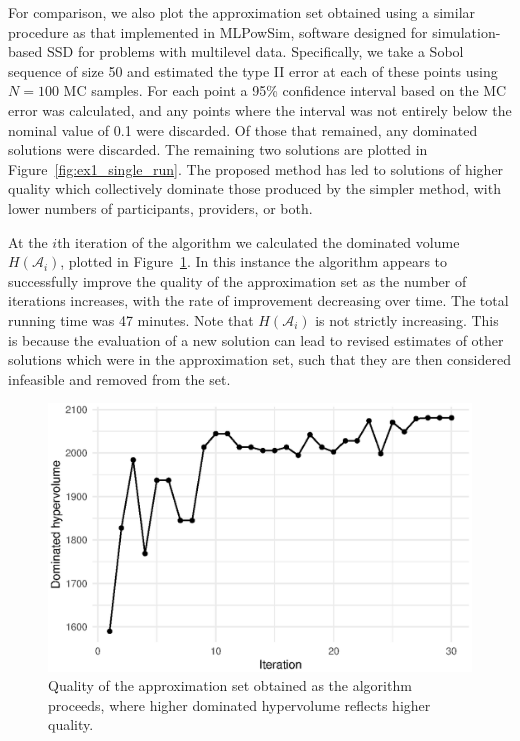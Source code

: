 \documentclass[sagev, doublespace, Crown]{sagej}
\begin{document}
For comparison, we also plot the approximation set obtained using a similar procedure as that implemented in MLPowSim, software designed for simulation-based SSD for problems with multilevel data. Specifically, we take a Sobol sequence of size 50 and estimated the type II error at each of these points using $N = 100$ MC samples. For each point a 95\% confidence interval based on the MC error was calculated, and any points where the interval was not entirely below the nominal value of 0.1 were discarded. Of those that remained, any dominated solutions were discarded. The remaining two solutions are plotted in Figure~\ref{fig:ex1_single_run}. The proposed method has led to solutions of higher quality which collectively dominate those produced by the simpler method, with lower numbers of participants, providers, or both.

At the $i$th iteration of the algorithm we calculated the dominated volume $H(\mathcal{A}_{i})$, plotted in Figure~\ref{fig:ex1_traj}. In this instance the algorithm appears to successfully improve the quality of the approximation set as the number of iterations increases, with the rate of improvement decreasing over time. The total running time was 47 minutes. Note that $H(\mathcal{A}_{i})$ is not strictly increasing. This is because the evaluation of a new solution can lead to revised estimates of other solutions which were in the approximation set, such that they are then considered infeasible and removed from the set. 

\begin{figure}
\centering
\includegraphics[scale=0.8]{fig5_ex1_traj.eps}
\caption{Quality of the approximation set obtained as the algorithm proceeds, where higher dominated hypervolume reflects higher quality.}
\label{fig:ex1_traj}
\end{figure}
\end{document}
